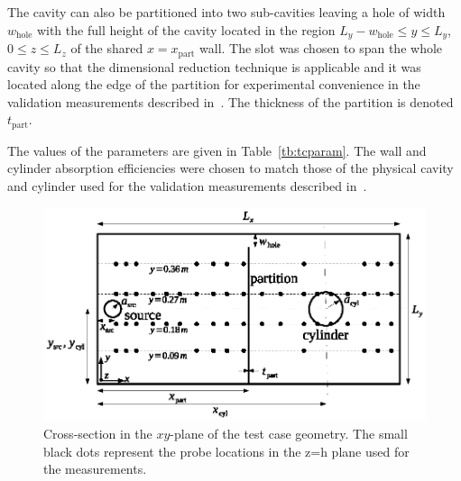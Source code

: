 \documentclass[a4paper]{article}
\numberwithin{equation}{section}
\newcounter{Table}
\begin{document}
The cavity can also be partitioned into two sub-cavities leaving a hole of width
$w_\mathrm{hole}$ with the full height of the cavity located in the region 
$L_y-w_\mathrm{hole} \leq y \leq L_y$, $0 \leq z \leq L_z$ of the shared 
$x=x_\mathrm{part}$ wall. The slot was chosen to span the whole cavity so that the 
dimensional reduction technique is applicable and it was located along the edge of the 
partition for experimental convenience in the validation measurements described in~\cite{Flintoft2017b}.
The thickness of the partition is denoted $t_\mathrm{part}$.

The values of the parameters are given in Table~\ref{tb:tcparam}. The wall and cylinder
absorption efficiencies were chosen to match those of the physical cavity and
cylinder used for the validation measurements described in~\cite{Flintoft2017b}.

\begin{figure}[ht]
\begin{center}
\includegraphics[width=0.8\linewidth]{figures/geometry}
\vspace{-4mm}
\caption{\label{fg:tcgeom} Cross-section in the $xy$-plane of the test case geometry.
The small black dots represent the probe locations in the z=h plane used for the measurements.}
\end{center}
\end{figure}
\end{document}
